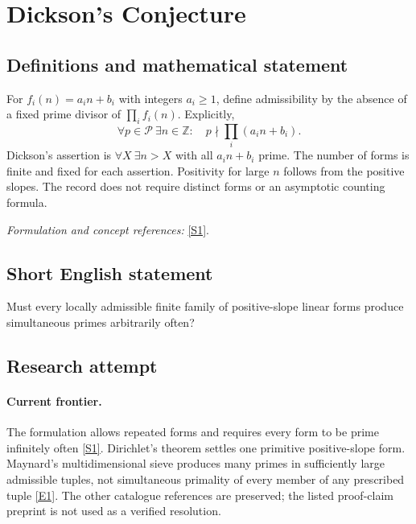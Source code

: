 \documentclass[11pt,a4paper]{article}
\newcommand{\Z}{\mathbb{Z}}
\newcommand{\sref}[2]{\hyperlink{source:#1:#2}{[S#2]}}
\newcommand{\eref}[2]{\hyperlink{extra:#1:#2}{[E#2]}}
\newif\ifshowcatalogue
\newcommand{\cataloguescope}[1]{\ifshowcatalogue
 \paragraph{Exact scope in the supplied catalogue.}
 \begin{quote}\small #1\end{quote}\fi}
\numberwithin{equation}{section}
\begin{document}
\setcounter{section}{0}
\clearpage
\section*{\texorpdfstring{Dickson's Conjecture}{Dickson's Conjecture}}\label{1293}
\subsection{Definitions and mathematical statement}
For $f_i(n)=a_in+b_i$ with integers $a_i\ge1$, define admissibility by the absence of a fixed prime divisor of $\prod_i f_i(n)$. Explicitly,
\[
 \forall p\in\mathcal P\ \exists n\in\Z:\quad p\nmid\prod_i(a_in+b_i).
\]
Dickson's assertion is $\forall X\ \exists n>X$ with all $a_in+b_i$ prime. The number of forms is finite and fixed for each assertion. Positivity for large $n$ follows from the positive slopes. The record does not require distinct forms or an asymptotic counting formula.
\par\smallskip\textit{Formulation and concept references:} \sref{1293}{1}.
\cataloguescope{For every integer k>=1 and every family f\_i(n)=a\_i*n+b\_i (1<=i<=k) with integers a\_i>=1 and b\_i, if for each prime p some integer n has p not dividing the product of the f\_i(n), then infinitely many positive integers n make every f\_i(n) prime.}
\subsection{Short English statement}
Must every locally admissible finite family of positive-slope linear forms produce simultaneous primes arbitrarily often?
\subsection{Research attempt}

\paragraph{Current frontier.}
The formulation allows repeated forms and requires every form to be prime infinitely often \sref{1293}{1}. Dirichlet's theorem settles one primitive positive-slope form. Maynard's multidimensional sieve produces many primes in sufficiently large admissible tuples, not simultaneous primality of every member of any prescribed tuple \eref{1293}{1}. The other catalogue references are preserved; the listed proof-claim preprint is not used as a verified resolution.
\end{document}
